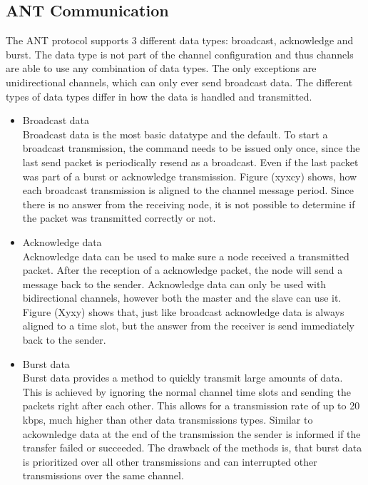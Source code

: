 \subsection{ANT Communication}

The ANT protocol supports 3 different data types: broadcast, acknowledge and burst. The data type is not part of the channel configuration and thus channels are able to use any combination of data types. The only exceptions are unidirectional channels, which can only ever send broadcast data. The different types of data types differ in how the data is handled and transmitted.

\begin{itemize}
	\item{Broadcast data} \hfill \\ Broadcast data is the most basic datatype and the default. To start a broadcast transmission, the command needs to be issued only once, since the last send packet is periodically resend as a broadcast. Even if the last packet was part of a burst or acknowledge transmission. Figure (xyxcy) shows, how each broadcast transmission is aligned to the channel message period.	Since there is no answer from the receiving node, it is not possible to determine if the packet was transmitted correctly or not.

	\item{Acknowledge data} \hfill \\ Acknowledge data can be used to make sure a node received a transmitted packet. After the reception of a acknowledge packet, the node will send a message back to the sender. Acknowledge data can only be used with bidirectional channels, however both the master and the slave can use it. Figure (Xyxy) shows that, just like broadcast acknowledge data is always aligned to a time slot, but the answer from the receiver is send immediately back to the sender.
	
	\item{Burst data} \hfill \\ Burst data provides a method to quickly transmit large amounts of data. This is achieved by ignoring the normal channel time slots and sending the packets right after each other. This allows for a transmission rate of up to 20 kbps, much higher than other data transmissions types. Similar to ackownledge data at the end of the transmission the sender is informed if the transfer failed or succeeded. The drawback of the methods is, that burst data is prioritized over all other transmissions and can interrupted other transmissions over the same channel.
\end{itemize}

